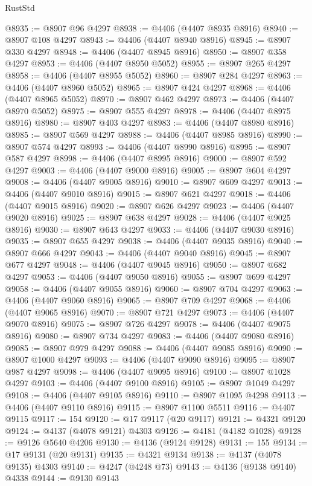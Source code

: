 \begin{lexlean}{RustStd}
\begin{coremodule}
{\begin{coremodule}
{{{{{{{{{{{{{{{{{{{{{{{{{{{{{{{{{{{{{{{{{{{{{{{{{{@8935 := @8907 @96 @4297
@8938 := @4406 (@4407 @8935 @8916)
@8940 := @8907 @108 @4297
@8943 := @4406 (@4407 @8940 @8916)
@8945 := @8907 @330 @4297
@8948 := @4406 (@4407 @8945 @8916)
@8950 := @8907 @358 @4297
@8953 := @4406 (@4407 @8950 @5052)
@8955 := @8907 @265 @4297
@8958 := @4406 (@4407 @8955 @5052)
@8960 := @8907 @284 @4297
@8963 := @4406 (@4407 @8960 @5052)
@8965 := @8907 @424 @4297
@8968 := @4406 (@4407 @8965 @5052)
@8970 := @8907 @462 @4297
@8973 := @4406 (@4407 @8970 @5052)
@8975 := @8907 @555 @4297
@8978 := @4406 (@4407 @8975 @8916)
@8980 := @8907 @403 @4297
@8983 := @4406 (@4407 @8980 @8916)
@8985 := @8907 @569 @4297
@8988 := @4406 (@4407 @8985 @8916)
@8990 := @8907 @574 @4297
@8993 := @4406 (@4407 @8990 @8916)
@8995 := @8907 @587 @4297
@8998 := @4406 (@4407 @8995 @8916)
@9000 := @8907 @592 @4297
@9003 := @4406 (@4407 @9000 @8916)
@9005 := @8907 @604 @4297
@9008 := @4406 (@4407 @9005 @8916)
@9010 := @8907 @609 @4297
@9013 := @4406 (@4407 @9010 @8916)
@9015 := @8907 @621 @4297
@9018 := @4406 (@4407 @9015 @8916)
@9020 := @8907 @626 @4297
@9023 := @4406 (@4407 @9020 @8916)
@9025 := @8907 @638 @4297
@9028 := @4406 (@4407 @9025 @8916)
@9030 := @8907 @643 @4297
@9033 := @4406 (@4407 @9030 @8916)
@9035 := @8907 @655 @4297
@9038 := @4406 (@4407 @9035 @8916)
@9040 := @8907 @666 @4297
@9043 := @4406 (@4407 @9040 @8916)
@9045 := @8907 @677 @4297
@9048 := @4406 (@4407 @9045 @8916)
@9050 := @8907 @682 @4297
@9053 := @4406 (@4407 @9050 @8916)
@9055 := @8907 @699 @4297
@9058 := @4406 (@4407 @9055 @8916)
@9060 := @8907 @704 @4297
@9063 := @4406 (@4407 @9060 @8916)
@9065 := @8907 @709 @4297
@9068 := @4406 (@4407 @9065 @8916)
@9070 := @8907 @721 @4297
@9073 := @4406 (@4407 @9070 @8916)
@9075 := @8907 @726 @4297
@9078 := @4406 (@4407 @9075 @8916)
@9080 := @8907 @734 @4297
@9083 := @4406 (@4407 @9080 @8916)
@9085 := @8907 @979 @4297
@9088 := @4406 (@4407 @9085 @8916)
@9090 := @8907 @1000 @4297
@9093 := @4406 (@4407 @9090 @8916)
@9095 := @8907 @987 @4297
@9098 := @4406 (@4407 @9095 @8916)
@9100 := @8907 @1028 @4297
@9103 := @4406 (@4407 @9100 @8916)
@9105 := @8907 @1049 @4297
@9108 := @4406 (@4407 @9105 @8916)
@9110 := @8907 @1095 @4298
@9113 := @4406 (@4407 @9110 @8916)
@9115 := @8907 @1100 @5511
@9116 := @4407 @9115
@9117 := 154
@9120 := @17 @9117 (@20 @9117)
@9121 := @4321 @9120
@9124 := @4137 (@4078 @9121) @4303
@9126 := @4181 (@4182 @1028)
@9128 := @9126 @5640 @4206
@9130 := @4136 (@9124 @9128)
@9131 := 155
@9134 := @17 @9131 (@20 @9131)
@9135 := @4321 @9134
@9138 := @4137 (@4078 @9135) @4303
@9140 := @4247 (@4248 @73)
@9143 := @4136 (@9138 @9140) @4338
@9144 := @9130 @9143
}}}}}}}}}}}}}}}}}}}}}}}}}}}}}}}}}}}}}}}}}}}}}}}}}}
\end{coremodule}}
\end{coremodule}
\end{lexlean}
